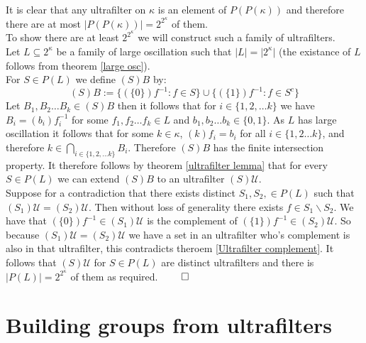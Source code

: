 \documentclass{report}
\begin{document}
It is clear that any ultrafilter on $\kappa$ is an element of $P(P(\kappa))$ and therefore there are at most $\vert P(P(\kappa)) \vert = 2^{2^{\kappa}}$ of them.\\
To show there are at least $2^{2^{\kappa}}$ we will construct such a family of ultrafilters.\\
Let $L\subseteq 2^\kappa$ be a family of large oscillation such that $\vert L \vert = \vert 2^\kappa \vert$ (the existance of $L$ follows from theorem \ref{large osc}).\\
For $S \in P(L)$ we define $(S)B$ by:
$$(S)B:=\{(\{0\})f^{-1}:f \in S\} \cup \{(\{1\})f^{-1}: f \in S^c \}$$
Let $B_1,B_2 \ldots B_k \in (S)B$ then it follows that for $i \in \{1,2,\ldots k\}$ we have $B_i = (b_i)f_i^{-1}$ for some $f_1,f_2 \ldots f_k \in L$ and $b_1,b_2 \ldots b_k\in \{0,1\}$. As $L$ has large oscillation it follows that for some $k\in \kappa$, $(k)f_i = b_i$ for all $i \in \{1,2 \ldots k\}$, and therefore $k \in \bigcap_{i \in \{1,2,\ldots k\}} B_i$. Therefore $(S)B$ has the finite intersection property. It therefore follows  by theorem \ref{ultrafilter lemma} that for every $S\in P(L)$ we can extend $(S)B$ to an ultrafilter $(S)\mathcal{U}$.\\
Suppose for a contradiction that there exists distinct $S_1, S_2,\in P(L)$ such that $(S_1)\mathcal{U} = (S_2)\mathcal{U}$. Then without loss of generality there exists $f \in S_1 \backslash S_2$. We have that $(\{0\})f^{-1} \in (S_1)\mathcal{U}$ is the complement of $(\{1\})f^{-1} \in (S_2)\mathcal{U}$. So because $(S_1)\mathcal{U} = (S_2)\mathcal{U}$ we have a set in an ultrafilter who's complement is also in that ultrafilter, this contradicts theroem \ref{Ultrafilter complement}. It follows that $(S)\mathcal{U}$ for $S \in P(L)$ are distinct ultrafilters and there is $\vert P(L) \vert = 2^{2^{\kappa}}$ of them as required. $\qed$
\section{Building groups from ultrafilters}
\end{document}
